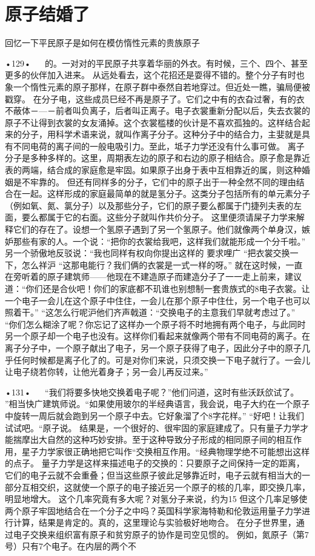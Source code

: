 \section{原子结婚了}

回忆一下平民原子是如何在模仿惰性元素的贵族原子

•129•
  
的。一对对的平民原子共享着华丽的外衣。有时候，三个、四个、甚至更多的伙伴加入进来。
从远处看去，这个花招还是耍得不错的。整个分子有时也象一个惰性元素的原子那样，在原子群中泰然自若地穿过。但近处一瞧，骗局便被戳穿。
在分子电，这些成员巳经不再是原子了。它们之中有的衣旮过奢，有的衣不蔽体－—－前者叫负离子，后者叫正离子。电子衣裳重新分配以后，失去衣裳的原子不让得到衣裳的女友涌掉。这个衣裳槛楼的伙计是不喜欢孤独的。这样结合起来的分子，用科学术语来说，就叫作离子分子。这种分子中的结合力，主婓就是具有不同电荷的离子间的一般电吸引力。至此，坻子力学还没有什么事可做。
离子分子是多种多样的。这里，周期表左边的原子和右边的原子相结合。原子愈是靠近表的两端，结合成的家庭愈是牢固。如果原子出身于表中互相靠近的属，则这种婚姻是不牢靠的。
但还有同样多的分子，它们中的原子出于一种全然不同的理由结合在一起。这样形成的家庭最简单的就是氢分子。这类分子包括所有的单元素分子（例如氧、氮、氯分子）以及那些分子，它们的原子要么都属于门捷列夫表的左面，要么都属于它的右面。这些分子就叫作共价分子。
这里便须请屎子力学来解释它们的存在了。设想一个氢原子遇到了另一个氢原子。他们就像两个单身汉，嫉妒那些有家的人。一个说：“把你的衣裳给我吧，这样我们就能形成一个分千啦。”
另一个骄傲地反驳说：“我也同样有权向你提出这样的
要求哩广
“把衣裳交换一下，怎么祥沪
“这那电能行？我们俩的衣裳是一式一样的呀。”
就在这时候，一直在旁听着的原子建筑师——他现在不建造原子而建造分子了一一走上前来，建议道：“你们还是合伙吧！你们的家底都不玑谁也别想制一套贵族式的8电子衣裳。让一个电子一会儿在这个原子中住住，一会儿在那个原子中住仕，另一个电子也可以照着干。”
“这怎么行呢沪他们齐声戟道：“交换电子的主意我们早就考虑过了。”
“你们怎么糊涂了呢？你忘记了这样办一个原子将不时地拥有两个电子，与此同时另一个原子却一个电子也没有。这样你们看起来就像两个带有不同电荷的离子。在离子分子中，一个原子献出了电子，另一个原子获得了电子，因此分子中的原子几乎任何时候都是离子化了的。可是对你们来说，只须交换一下电子就行了。一会儿让电子绕若你转，让他光着身子；另一会儿再反过来。”

•131•
  
“我们将要多快地交换着电子呢？”他们问道，这时有些沃跃欱试了。
”相当快广建筑师说。“如果使用玻尔的半经典语言，我会说，电子大约在一个原子中旋转一周后就会跑到另一个原子中去。它好象溜了个8字花样。”
“好吧！让我们试试吧。“原子说。
结果是，一个很好的、很牢固的家庭建成了。只有量子力学才能揣摩出大自然的这种巧妙安排。至于这种导致分子形成的相同原子间的相互作用，星子力学家很正确地把它叫作“交换相互作用。“经典物理学绝不可能想出这样的点子。
量子力学是这样来描述电子的交换的：只要原子之间保持一定的距离，它们的电子云就不会重叠；但当这些原子彼此足够靠近时，电子云就有相当大的一部分互相交织，这就使一个原子的电子接近另一个原子的核的几率，即交换几率，明显地增大。
这个几率究竟有多大呢？对氢分子来说，约为15%
但这个几率足够使两个原子牢固地结合在一个分子之中吗？英国科学家海特勒和伦敦运用量子力学进行计算，结果是肯定的。真的，这里理论与实验极好地吻合。
在分子世界里，通过电子交换来组织富有原子和贫穷原子的协作是司空见惯的。
例如，氮原子（第7号）只有7个电子。在内层的两个不

